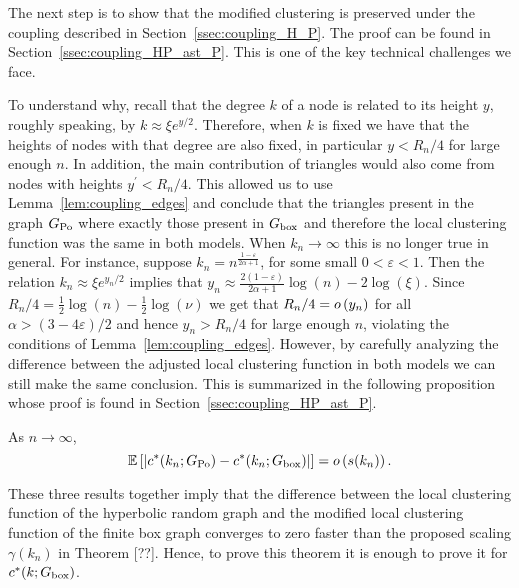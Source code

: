 The next step is to show that the modified clustering is preserved under the coupling described in Section~\ref{ssec:coupling_H_P}. The proof can be found in Section~\ref{ssec:coupling_HP_ast_P}. This is one of the key technical challenges we face. 

To understand why, recall that the degree $k$ of a node is related to its height $y$, roughly speaking, by $k \approx \xi e^{y/2}$. Therefore, when $k$ is fixed we have that the heights of nodes with that degree are also fixed, in particular $y < R_n/4$ for large enough $n$. In addition, the main contribution of triangles would also come from nodes with heights $y^\prime < R_n/4$. This allowed us to use Lemma~\ref{lem:coupling_edges} and conclude that the triangles present in the graph $G_{\text{Po}}$ where exactly those present in $G_{\text{box}}$ and therefore the local clustering function was the same in both models. When $k_n \to \infty$ this is no longer true in general. For instance, suppose $k_n = n^{\frac{1-\varepsilon}{2\alpha + 1}}$, for some small $0 < \varepsilon < 1$. Then the relation $k_n \approx \xi e^{y_n/2}$ implies that $y_n \approx \frac{2(1-\varepsilon)}{2\alpha + 1}\log(n) - 2\log(\xi)$. Since
$R_n/4 = \frac{1}{2}\log(n) - \frac{1}{2}\log(\nu)$ we get that $R_n/4 = o\left(y_n\right)$ for all $\alpha > (3 - 4\varepsilon)/2$ and hence $y_n > R_n/4$ for large enough $n$, violating the conditions of Lemma~\ref{lem:coupling_edges}. However, by carefully analyzing the difference between the adjusted local clustering function in both models we can still make the same conclusion. This is summarized in the following proposition whose proof is found in Section~\ref{ssec:coupling_HP_ast_P}.

\begin{proposition}\label{prop:couling_c_H_P}
As $n \to \infty$,
\[
	\mathbb{E}\left[\left|c^\ast(k_n; G_{\text{Po}}) - c^\ast(k_n; G_{\text{box}})\right|\right] = o\left(s(k_n)\right).
\]
\end{proposition}

These three results together imply that the difference between the local clustering function of the hyperbolic random graph and the modified local clustering function of the finite box graph converges to zero faster than the proposed scaling $\gamma(k_n)$ in Theorem [??]. Hence, to prove this theorem it is enough to prove it for $c^\ast(k; G_{\text{box}})$. 

